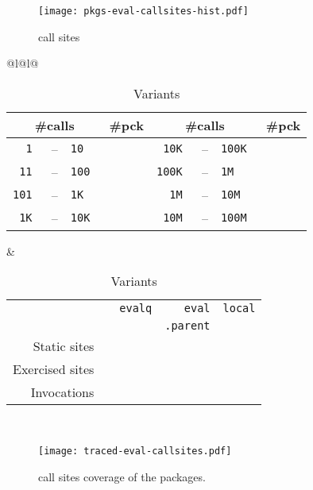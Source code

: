\documentclass[screen,acmsmall]{acmart}%
\renewcommand{\k}[1]{\lstinline |#1|\xspace}
\begin{document}
\begin{figure}[H]
  \texttt{[image: pkgs-eval-callsites-hist.pdf]}
  \caption{ \eval call sites}\label{fig:pkgs-eval-callsites-hist}
\end{figure}
\begin{table}[H]
\centering
  \small
\begin{tabular}{@{}l@{\hspace{1.5cm}}l@{}}
\begin{minipage} {5cm}\small
  \begin{tabular}{r@{\,}r@{\,}l@{}r|r@{\,}r@{\,}l@{}r} \toprule
    \multicolumn{3}{c}{\bf \small\#calls} &\bf \small \#pck
&     \multicolumn{3}{c}{\bf \small\#calls} &\bf \small\#pck \\\midrule
\tt 1 &--& \tt 10      & \packageBina  & \tt 10K &--&\tt 100K  & \packageBine\\
\tt 11 &--& \tt 100    & \packageBinb  & \tt 100K &--&\tt 1M  & \packageBinf\\
\tt 101 &--& \tt 1K    & \packageBinc  & \tt 1M &--&\tt 10M   & \packageBing\\
\tt 1K &--& \tt 10K    & \packageBind  & \tt 10M &--& \tt 100M & \packageBinh\\\bottomrule
\end{tabular}
\caption{Call frequency}\label{tab:freq}
\end{minipage}
&
\begin{minipage}{7cm}\small
\begin{tabular}{@{\,}r|rrrr}\toprule
  &\eval & \k{evalq} & \k{eval} & \k{local}\\[-1.5mm]
           & & & \k{.parent} &\\\midrule
\small Static sites &\packageStaticeval&\packageStaticevalq&\packageStaticevalparent&\packageStaticlocal \\
\small Exercised sites&\packageTriggeredeval&\packageTriggeredevalq&\packageTriggeredevalparent&\packageTriggeredlocal\\
\small Invocations&\packageEvalsRnd&\packageEvalqsRnd&\packageEparentsRnd&\packageLocalsRnd\\\bottomrule
\end{tabular}~\\[2mm]\caption{Variants}\label{tab:variantseval}
\end{minipage}\end{tabular}

\end{table}
\begin{figure}[H]
  \texttt{[image: traced-eval-callsites.pdf]} \centering
  \caption{\eval call sites coverage of the \PkgPackages packages.}%
  \label{fig:traced-eval-callsites}
\end{figure}
\end{document}
